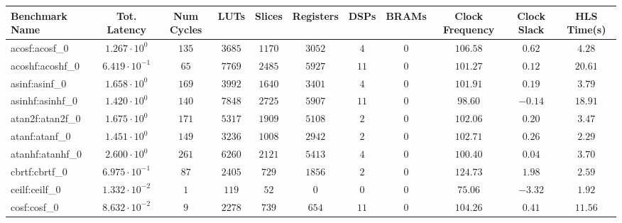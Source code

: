 \begin{tabular}{|l|c|c|c|c|c|c|c|c|c|c|}
\hline
Benchmark Name               & Tot. Latency            & Num Cycles & LUTs       & Slices    & Registers & DSPs    & BRAMs & Clock Frequency & Clock Slack & HLS Time(s) \\
\hline
acosf:acosf\_0               & $ 1.267 \cdot 10^{0}  $ & $ 135    $ & $ 3685   $ & $ 1170  $ & $ 3052  $ & $ 4   $ & $ 0 $ & $ 106.58      $ & $ 0.62    $ & $ 4.28    $ \\
acoshf:acoshf\_0             & $ 6.419 \cdot 10^{-1} $ & $ 65     $ & $ 7769   $ & $ 2485  $ & $ 5927  $ & $ 11  $ & $ 0 $ & $ 101.27      $ & $ 0.12    $ & $ 20.61   $ \\
asinf:asinf\_0               & $ 1.658 \cdot 10^{0}  $ & $ 169    $ & $ 3992   $ & $ 1640  $ & $ 3401  $ & $ 4   $ & $ 0 $ & $ 101.91      $ & $ 0.19    $ & $ 3.79    $ \\
asinhf:asinhf\_0             & $ 1.420 \cdot 10^{0}  $ & $ 140    $ & $ 7848   $ & $ 2725  $ & $ 5907  $ & $ 11  $ & $ 0 $ & $ 98.60       $ & $ -0.14   $ & $ 18.91   $ \\
atan2f:atan2f\_0             & $ 1.675 \cdot 10^{0}  $ & $ 171    $ & $ 5317   $ & $ 1909  $ & $ 5108  $ & $ 2   $ & $ 0 $ & $ 102.06      $ & $ 0.20    $ & $ 3.47    $ \\
atanf:atanf\_0               & $ 1.451 \cdot 10^{0}  $ & $ 149    $ & $ 3236   $ & $ 1008  $ & $ 2942  $ & $ 2   $ & $ 0 $ & $ 102.71      $ & $ 0.26    $ & $ 2.29    $ \\
atanhf:atanhf\_0             & $ 2.600 \cdot 10^{0}  $ & $ 261    $ & $ 6260   $ & $ 2121  $ & $ 5413  $ & $ 4   $ & $ 0 $ & $ 100.40      $ & $ 0.04    $ & $ 3.70    $ \\
cbrtf:cbrtf\_0               & $ 6.975 \cdot 10^{-1} $ & $ 87     $ & $ 2405   $ & $ 729   $ & $ 1856  $ & $ 2   $ & $ 0 $ & $ 124.73      $ & $ 1.98    $ & $ 2.59    $ \\
ceilf:ceilf\_0               & $ 1.332 \cdot 10^{-2} $ & $ 1      $ & $ 119    $ & $ 52    $ & $ 0     $ & $ 0   $ & $ 0 $ & $ 75.06       $ & $ -3.32   $ & $ 1.92    $ \\
cosf:cosf\_0                 & $ 8.632 \cdot 10^{-2} $ & $ 9      $ & $ 2278   $ & $ 739   $ & $ 654   $ & $ 11  $ & $ 0 $ & $ 104.26      $ & $ 0.41    $ & $ 11.56   $ \\

\end{tabular}

